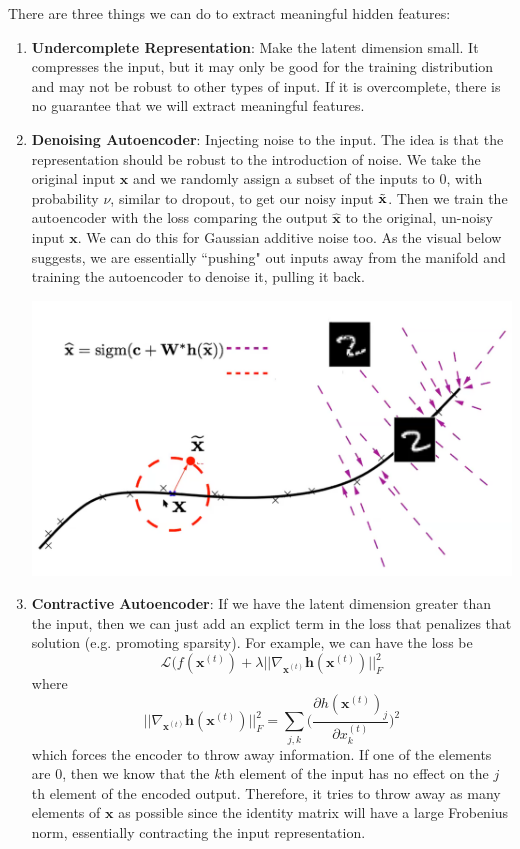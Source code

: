     There are three things we can do to extract meaningful hidden features: 
    \begin{enumerate}
      \item \textbf{Undercomplete Representation}: Make the latent dimension small. It compresses the input, but it may only be good for the training distribution and may not be robust to other types of input. If it is overcomplete, there is no guarantee that we will extract meaningful features. 

      \item \textbf{Denoising Autoencoder}: Injecting noise to the input. The idea is that the representation should be robust to the introduction of noise. We take the original input $\mathbf{x}$ and we randomly assign a subset of the inputs to $0$, with probability $\nu$, similar to dropout, to get our noisy input $\Tilde{\mathbf{x}}$. Then we train the autoencoder with the loss comparing the output $\hat{\mathbf{x}}$ to the original, un-noisy input $\mathbf{x}$. We can do this for Gaussian additive noise too. As the visual below suggests, we are essentially ``pushing" out inputs away from the manifold and training the autoencoder to denoise it, pulling it back. 

        \begin{center}
            \includegraphics[scale=0.3]{img/denoising_autoencoder.png}
        \end{center}
    
      \item \textbf{Contractive Autoencoder}: If we have the latent dimension greater than the input, then we can just add an explict term in the loss that penalizes that solution (e.g. promoting sparsity). For example, we can have the loss be 
      \[\mathcal{L}(f(\mathbf{x}^{(t)}) + \lambda || \nabla_{\mathbf{x}^{(t)}} \mathbf{h}(\mathbf{x}^{(t)})||^2_F\]
      where 
      \[||\nabla_{\mathbf{x}^{(t)}} \mathbf{h}(\mathbf{x}^{(t)})||_F^2 = \sum_{j, k} \bigg(\frac{\partial h(\mathbf{x}^{(t)})_j}{\partial x_k^{(t)}} \bigg)^2\]
      which forces the encoder to throw away information. If one of the elements are $0$, then we know that the $k$th element of the input has no effect on the $j$th element of the encoded output. Therefore, it tries to throw away as many elements of $\mathbf{x}$ as possible since the identity matrix will have a large Frobenius norm, essentially contracting the input representation.  


\end{enumerate}
